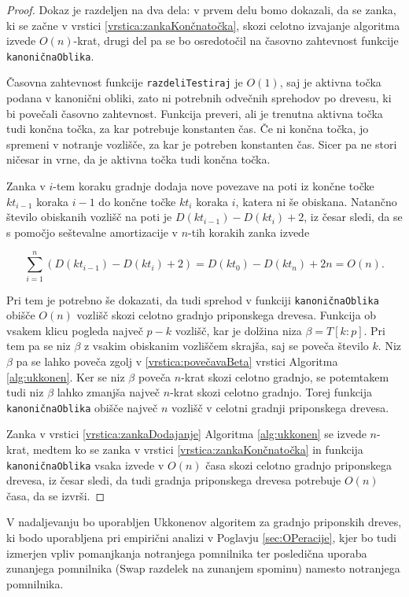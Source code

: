 \begin{proof}

Dokaz je razdeljen na dva dela: v prvem delu bomo dokazali, da se zanka, ki se začne v vrstici \ref{vrstica:zankaKončnatočka}, skozi celotno izvajanje algoritma izvede $O(n)$-krat, drugi del pa se bo osredotočil na časovno zahtevnost funkcije \texttt{kanoničnaOblika}. 

Časovna zahtevnost funkcije \texttt{razdeliTestiraj} je $O(1)$, saj je aktivna točka podana v kanonični obliki, zato ni potrebnih odvečnih sprehodov po drevesu, ki bi povečali časovno zahtevnost. Funkcija preveri, ali je trenutna aktivna točka tudi končna točka, za kar potrebuje konstanten čas. Če ni končna točka, jo spremeni v notranje vozlišče, za kar je potreben konstanten čas. Sicer pa ne stori ničesar in vrne, da je aktivna točka tudi končna točka.

Zanka v $i$-tem koraku gradnje dodaja nove povezave na poti iz končne točke $kt_{i-1}$ koraka $i-1$ do končne točke $kt_i$ koraka $i$, katera ni še obiskana. Natančno število obiskanih vozlišč na poti je $D(kt_{i-1})-D(kt_i)+2$, iz česar sledi, da se s pomočjo seštevalne amortizacije v $n$-tih korakih zanka izvede


$$
    \sum_{i=1}^n \left(D(kt_{i-1})-D(kt_i)+2\right)=D(kt_0)-D(kt_n)+2n=O(n).
$$

Pri tem je potrebno še dokazati, da tudi sprehod v funkciji \texttt{kanoničnaOblika} obišče $O(n)$ vozlišč skozi celotno gradnjo priponskega drevesa. Funkcija ob vsakem klicu pogleda največ $p-k$ vozlišč, kar je dolžina niza $\beta=T[k:p]$. Pri tem pa se niz $\beta$ z vsakim obiskanim vozliščem skrajša, saj se poveča število $k$. Niz $\beta$ pa se lahko poveča zgolj v \ref{vrstica:povečavaBeta} vrstici Algoritma \ref{alg:ukkonen}. Ker se niz $\beta$ poveča $n$-krat skozi celotno gradnjo, se potemtakem tudi niz $\beta$ lahko zmanjša največ $n$-krat skozi celotno gradnjo. Torej funkcija \texttt{kanoničnaOblika} obišče največ $n$ vozlišč v celotni gradnji priponskega drevesa.


Zanka v vrstici \ref{vrstica:zankaDodajanje} Algoritma \ref{alg:ukkonen} se izvede $n$-krat, medtem ko se zanka v vrstici \ref{vrstica:zankaKončnatočka} in funkcija \texttt{kanoničnaOblika} vsaka izvede v $O(n)$ časa skozi celotno gradnjo priponskega drevesa, iz česar sledi, da tudi gradnja priponskega drevesa potrebuje $O(n)$ časa, da se izvrši.
  
\end{proof}


V nadaljevanju bo uporabljen Ukkonenov algoritem za gradnjo priponskih dreves, ki bodo uporabljena pri empirični analizi v Poglavju \ref{sec:OPeracije}, kjer bo tudi izmerjen vpliv pomanjkanja notranjega pomnilnika ter posledična uporaba zunanjega pomnilnika (Swap razdelek na zunanjem spominu) namesto notranjega pomnilnika.